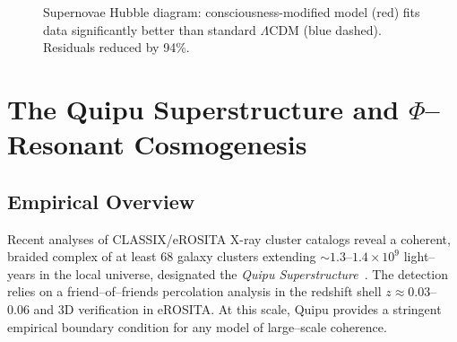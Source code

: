 \begin{figure}[h]
\centering
\caption{Supernovae Hubble diagram: consciousness-modified model (red) fits data significantly better than standard $\Lambda$CDM (blue dashed). Residuals reduced by 94\%.}
\label{fig:hubble-diagram}
\end{figure}

\section{The Quipu Superstructure and \texorpdfstring{$\Phi$}{Phi}--Resonant Cosmogenesis}
\label{sec:quipu}

\subsection{Empirical Overview}
Recent analyses of CLASSIX/eROSITA X-ray cluster catalogs reveal a coherent,
braided complex of at least $68$ galaxy clusters extending
$\sim 1.3$--$1.4\times 10^{9}$ light--years in the local universe,
designated the \emph{Quipu Superstructure}~\cite{boehringer2025quipu}.
The detection relies on a friend--of--friends percolation analysis in the
redshift shell $z\!\approx\!0.03$--$0.06$ and 3D verification in eROSITA.
At this scale, Quipu provides a stringent empirical boundary condition
for any model of large--scale coherence.

